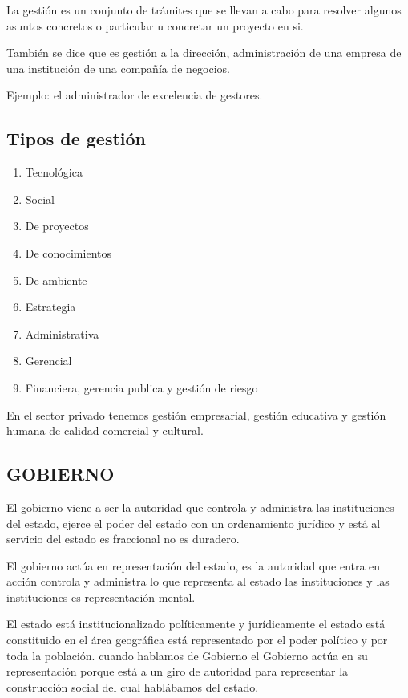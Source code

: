 \documentclass[
  a4paper,
]{article}
\providecommand{\tightlist}{%
  \setlength{\itemsep}{0pt}\setlength{\parskip}{0pt}}\usepackage{longtable,booktabs,array}
\begin{document}
La gestión es un conjunto de trámites que se llevan a cabo para resolver
algunos asuntos concretos o particular u concretar un proyecto en si.

También se dice que es gestión a la dirección, administración de una
empresa de una institución de una compañía de negocios.

Ejemplo: el administrador de excelencia de gestores.

\hypertarget{tipos-de-gestiuxf3n}{%
\subsection{Tipos de gestión}\label{tipos-de-gestiuxf3n}}

\begin{enumerate}
\def\labelenumi{\arabic{enumi}.}
\tightlist
\item
  Tecnológica
\item
  Social
\item
  De proyectos
\item
  De conocimientos
\item
  De ambiente
\item
  Estrategia
\item
  Administrativa
\item
  Gerencial
\item
  Financiera, gerencia publica y gestión de riesgo
\end{enumerate}

En el sector privado tenemos gestión empresarial, gestión educativa y
gestión humana de calidad comercial y cultural.

\hypertarget{gobierno}{%
\subsection{GOBIERNO}\label{gobierno}}

El gobierno viene a ser la autoridad que controla y administra las
instituciones del estado, ejerce el poder del estado con un ordenamiento
jurídico y está al servicio del estado es fraccional no es duradero.

El gobierno actúa en representación del estado, es la autoridad que
entra en acción controla y administra lo que representa al estado las
instituciones y las instituciones es representación mental.

El estado está institucionalizado políticamente y jurídicamente el
estado está constituido en el área geográfica está representado por el
poder político y por toda la población. cuando hablamos de Gobierno el
Gobierno actúa en su representación porque está a un giro de autoridad
para representar la construcción social del cual hablábamos del estado.
\end{document}
